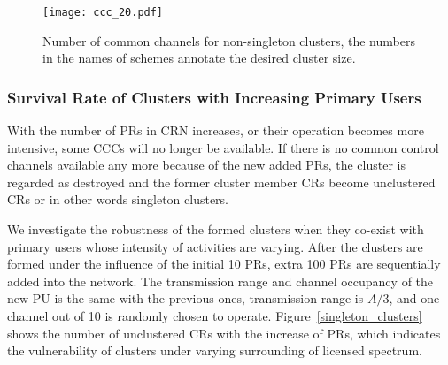 \begin{figure}[h!]
  \centering
  \texttt{[image: ccc\_20.pdf]}
  \caption{Number of common channels for non-singleton clusters, the numbers in the names of schemes annotate the desired cluster size.}
  \label{ccc_per_nonsingleton}
\end{figure}

\subsubsection{Survival Rate of Clusters with Increasing Primary Users}
With the number of PRs in CRN increases, or their operation becomes more intensive, some CCCs will no longer be available.
If there is no common control channels available any more because of the new added PRs, the cluster is regarded as destroyed and the former cluster member CRs become unclustered CRs or in other words singleton clusters.

We investigate the robustness of the formed clusters when they co-exist with primary users whose intensity of activities are varying.
After the clusters are formed under the influence of the initial 10 PRs, extra 100 PRs are sequentially added into the network.
The transmission range and channel occupancy of the new PU is the same with the previous ones, \ie transmission range is $A/3$, and one channel out of 10 is randomly chosen to operate.
%
Figure~\ref{singleton_clusters} shows the number of unclustered CRs with the increase of PRs, which indicates the vulnerability of clusters under varying surrounding of licensed spectrum.


